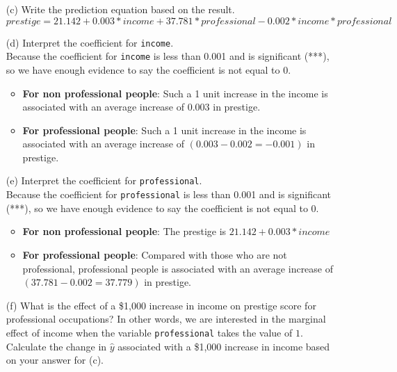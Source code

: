 \documentclass[12pt,letterpaper]{article}
\begin{document}
\begin{enumerate}
	\vspace{.5cm}

	\item [(c)]
	Write the prediction equation based on the result.\\
	
	$prestige = 21.142 + 0.003 * income + 37.781 * professional - 0.002 * income * professional$
	
	\vspace{.5cm}
	\item [(d)]
	Interpret the coefficient for \texttt{income}.\\
	
	Because the coefficient for \texttt{income} is less than 0.001 and is significant (***), so we have enough evidence to say the coefficient is not equal to 0.
	\begin{itemize}
		\item \textbf{For non professional people}: Such a 1 unit increase in the income is associated with an average increase of 0.003 in prestige.
		\item \textbf{For professional people}: Such a 1 unit increase in the income is associated with an average increase of $(0.003 - 0.002 = -0.001)$ in prestige.
	\end{itemize}
	\vspace{.5cm}
	\item [(e)]
	Interpret the coefficient for \texttt{professional}.\\
	
	Because the coefficient for \texttt{professional} is less than 0.001 and is significant (***), so we have enough evidence to say the coefficient is not equal to 0.
	\begin{itemize}
		\item  \textbf{For non professional people}: The prestige is $21.142 + 0.003 * income$
		\item \textbf{For professional people}: Compared with those who are not professional, professional people is associated with an average increase of $(37.781 - 0.002 = 37.779)$ in prestige.
	\end{itemize}
	\newpage
	\item [(f)]
	What is the effect of a \$1,000 increase in income on prestige score for professional occupations? In other words, we are interested in the marginal effect of income when the variable \texttt{professional} takes the value of $1$. Calculate the change in $\hat{y}$ associated with a \$1,000 increase in income based on your answer for (c).\\


\end{enumerate}
\end{document}
